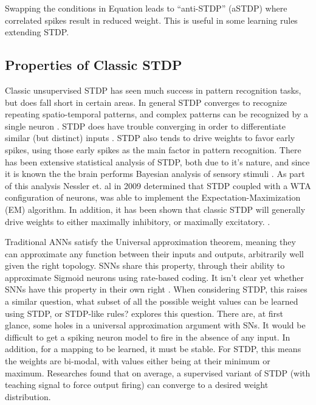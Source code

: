     Swapping the conditions in Equation \cite{eq:classic_stdp} leads to
    ``anti-STDP'' (aSTDP) where correlated spikes result in reduced weight. This
    is useful in some learning rules extending STDP.


    \subsection{Properties of Classic STDP}
    Classic unsupervised STDP has seen much success in pattern recognition
    tasks, but does fall short in certain areas. In general STDP converges to
    recognize repeating spatio-temporal patterns, and complex patterns can be
    recognized by a single neuron \cite{tavanaei_2019}. STDP does have trouble
    converging in order to differentiate similar (but distinct) inputs
    \cite{vigneron_2020}. STDP also tends to drive weights to favor early
    spikes, using those early spikes as the main factor in pattern
    recognition. There has been extensive statistical analysis of STDP, both due
    to it's nature, and since it is known the the brain performs Bayesian
    analysis of sensory stimuli \cite{tavanaei_2019}. As part of this analysis
    Nessler et. al in 2009 determined that STDP coupled with a WTA configuration
    of neurons, was able to implement the Expectation-Maximization (EM)
    algorithm. In addition, it has been shown that classic STDP will generally
    drive weights to either maximally inhibitory, or maximally
    excitatory. .


    Traditional ANNs satisfy the Universal approximation theorem, meaning they
    can approximate any function between their inputs and outputs, arbitrarily
    well given the right topology. SNNs share this property, through their
    ability to approximate Sigmoid neurons using rate-based coding. It isn't
    clear yet whether SNNs have this property in their own right
    \cite{legenstein_2005}. When considering STDP, this raises a similar
    question, what subset of all the possible weight values can be learned using
    STDP, or STDP-like rules? \cite{legenstein_2005} explores this
    question. There are, at first glance, some holes in a universal
    approximation argument with SNs. It would be difficult to get a spiking
    neuron model to fire in the absence of any input. In addition, for a mapping
    to be learned, it must be stable. For STDP, this means the weights are
    bi-modal, with values either being at their minimum or maximum. Researches
    found that on average, a supervised variant of STDP (with teaching signal to
    force output firing) can converge to a desired weight distribution.


